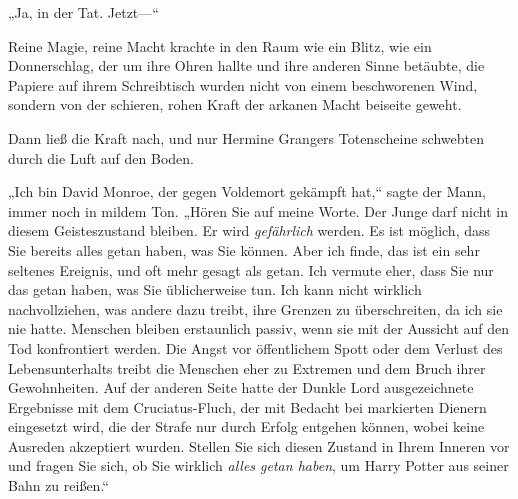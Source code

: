 „Ja, in der Tat. Jetzt—“

Reine Magie, reine Macht krachte in den Raum wie ein Blitz, wie ein Donnerschlag, der um ihre Ohren hallte und ihre anderen Sinne betäubte, die Papiere auf ihrem Schreibtisch wurden nicht von einem beschworenen Wind, sondern von der schieren, rohen Kraft der arkanen Macht beiseite geweht.

Dann ließ die Kraft nach, und nur Hermine Grangers Totenscheine schwebten durch die Luft auf den Boden.

„Ich bin David Monroe, der gegen Voldemort gekämpft hat,“ sagte der Mann, immer noch in mildem Ton. „Hören Sie auf meine Worte. Der Junge darf nicht in diesem Geisteszustand bleiben. Er wird \emph{gefährlich} werden. Es ist möglich, dass Sie bereits alles getan haben, was Sie können. Aber ich finde, das ist ein sehr seltenes Ereignis, und oft mehr gesagt als getan. Ich vermute eher, dass Sie nur das getan haben, was Sie üblicherweise tun. Ich kann nicht wirklich nachvollziehen, was andere dazu treibt, ihre Grenzen zu überschreiten, da ich sie nie hatte. Menschen bleiben erstaunlich passiv, wenn sie mit der Aussicht auf den Tod konfrontiert werden. Die Angst vor öffentlichem Spott oder dem Verlust des Lebensunterhalts treibt die Menschen eher zu Extremen und dem Bruch ihrer Gewohnheiten. Auf der anderen Seite hatte der Dunkle Lord ausgezeichnete Ergebnisse mit dem Cruciatus-Fluch, der mit Bedacht bei markierten Dienern eingesetzt wird, die der Strafe nur durch Erfolg entgehen können, wobei keine Ausreden akzeptiert wurden. Stellen Sie sich diesen Zustand in Ihrem Inneren vor und fragen Sie sich, ob Sie wirklich \emph{alles getan haben}, um Harry Potter aus seiner Bahn zu reißen.“

